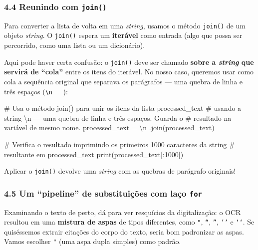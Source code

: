 \documentclass[
  brazilian,
  11pt,
]{article}
\newenvironment{Shaded}{\begin{snugshade}}{\end{snugshade}}
\newcommand{\BuiltInTok}[1]{\textcolor[rgb]{0.50,0.55,0.55}{#1}}
\newcommand{\CharTok}[1]{\textcolor[rgb]{0.24,0.68,0.91}{#1}}
\newcommand{\CommentTok}[1]{\textcolor[rgb]{0.48,0.49,0.49}{#1}}
\newcommand{\DecValTok}[1]{\textcolor[rgb]{0.96,0.45,0.00}{#1}}
\newcommand{\NormalTok}[1]{\textcolor[rgb]{0.81,0.81,0.76}{#1}}
\newcommand{\OperatorTok}[1]{\textcolor[rgb]{0.81,0.81,0.76}{#1}}
\newcommand{\StringTok}[1]{\textcolor[rgb]{0.96,0.31,0.31}{#1}}
\let\oldtexttt\texttt
\renewcommand{\texttt}[1]{{\color{inlink}\oldtexttt{#1}}}
\begin{document}
\subsubsection{\texorpdfstring{4.4 Reunindo com
\texttt{join()}}{4.4 Reunindo com join()}}\label{reunindo-com-join}

Para converter a lista de volta em uma \emph{string}, usamos o método
\texttt{join()} de um objeto \emph{string}. O \texttt{join()} espera um
\textbf{iterável} como entrada (algo que possa ser percorrido, como uma
lista ou um dicionário).

Aqui pode haver certa confusão: o \texttt{join()} deve ser chamado
\textbf{sobre a \emph{string} que servirá de ``cola''} entre os itens do
iterável. No nosso caso, queremos usar como cola a sequência original
que separava os parágrafos --- uma quebra de linha e três espaços
(\texttt{\textquotesingle{}\textbackslash{}n\ \ \ \textquotesingle{}}):

\begin{Shaded}
\begin{Highlighting}[]
\CommentTok{\# Usa o método join() para unir os itens da lista \textquotesingle{}processed\_text\textquotesingle{}}
\CommentTok{\# usando a string \textquotesingle{}\textbackslash{}n   \textquotesingle{} — uma quebra de linha e três espaços. Guarda o}
\CommentTok{\# resultado na variável de mesmo nome.}
\NormalTok{processed\_text }\OperatorTok{=} \StringTok{\textquotesingle{}}\CharTok{\textbackslash{}n}\StringTok{   \textquotesingle{}}\NormalTok{.join(processed\_text)}

\CommentTok{\# Verifica o resultado imprimindo os primeiros 1000 caracteres da string}
\CommentTok{\# resultante em \textquotesingle{}processed\_text\textquotesingle{}}
\BuiltInTok{print}\NormalTok{(processed\_text[:}\DecValTok{1000}\NormalTok{])}
\end{Highlighting}
\end{Shaded}

Aplicar o \texttt{join()} devolve uma \emph{string} com as quebras de
parágrafo originais!

\subsubsection{\texorpdfstring{4.5 Um ``pipeline'' de substituições com
laço
\texttt{for}}{4.5 Um ``pipeline'' de substituições com laço for}}\label{um-pipeline-de-substituiuxe7uxf5es-com-lauxe7o-for}

Examinando o texto de perto, dá para ver resquícios da digitalização: o
OCR resultou em uma \textbf{mistura de aspas} de tipos diferentes, como
\texttt{"}, \texttt{“}, \texttt{”}, \texttt{’’} e \texttt{‘‘}. Se
quiséssemos extrair citações do corpo do texto, seria bom padronizar as
aspas. Vamos escolher \texttt{"} (uma aspa dupla simples) como padrão.
\end{document}
